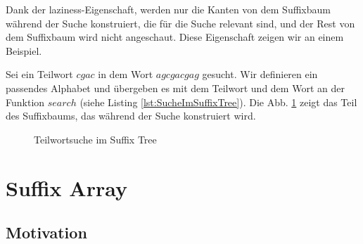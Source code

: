 \documentclass[12pt]{report}
\begin{document}
Dank der laziness-Eigenschaft, werden nur die Kanten von dem Suffixbaum während der Suche konstruiert, die für die Suche relevant sind, und der Rest von dem Suffixbaum wird nicht angeschaut. Diese Eigenschaft zeigen wir an einem Beispiel.

Sei ein Teilwort $cgac$ in dem Wort $agcgacgag$ gesucht. Wir definieren ein passendes Alphabet und übergeben es mit dem Teilwort und dem Wort an der Funktion $search$ (siehe Listing \ref{lst:SucheImSuffixTree}). Die Abb. \ref{fig:teilwortuche} zeigt das Teil des Suffixbaums, das während der Suche konstruiert wird.

\begin{figure}[htb]
\centering
{}
\caption{Teilwortsuche im Suffix Tree}
\label{fig:teilwortuche}
\end{figure}

\chapter{Suffix Array}
\label{sec:SuffixArray}

\section{Motivation}
\label{sec:Motivation}
\end{document}
